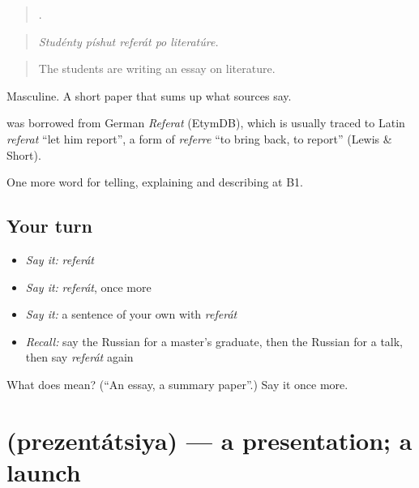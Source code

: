 \begin{quote}
    .
\end{quote}

\begin{quote}
\emph{Studénty píshut referát po literatúre.}
\end{quote}

\begin{quote}
The students are writing an essay on literature.
\end{quote}

Masculine. A short paper that sums up what sources say.

\begin{cousinweb}
\textbf{} was borrowed from German \emph{Referat} (EtymDB), which is usually traced to Latin \emph{referat} \textquotedblleft{}let him report\textquotedblright{}, a form of \emph{referre} \textquotedblleft{}to bring back, to report\textquotedblright{} (Lewis \& Short).
\end{cousinweb}

\begin{grammarlens}[title={What you've built}]
One more word for telling, explaining and describing at B1.
\end{grammarlens}

\subsection*{Your turn}
\begin{itemize}
\raggedright
  \item \emph{Say it:} \emph{referát}
  \item \emph{Say it:} \emph{referát}, once more
  \item \emph{Say it:} a sentence of your own with \emph{referát}
  \item \emph{Recall:} say the Russian for a master’s graduate, then the Russian for a talk, then say \emph{referát} again
\end{itemize}

\begin{tcolorbox}[breakable,colback=teal!4,colframe=teal!35!black,title={Before you move on}]
What does  mean? (\textquotedblleft{}An essay, a summary paper\textquotedblright{}.) Say it once more.
\end{tcolorbox}
\section[\texorpdfstring{\ru{презентация} (prezentátsiya)}{презентация (prezentátsiya)}]{ (prezentátsiya) — a presentation; a launch}


